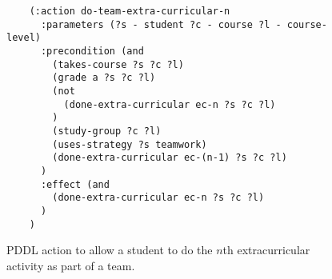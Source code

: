 \begin{figure}[t]
    \begin{lstlisting}
    (:action do-team-extra-curricular-n
      :parameters (?s - student ?c - course ?l - course-level)
      :precondition (and 
        (takes-course ?s ?c ?l)
        (grade a ?s ?c ?l)
        (not
          (done-extra-curricular ec-n ?s ?c ?l)
        )
        (study-group ?c ?l)
        (uses-strategy ?s teamwork)
        (done-extra-curricular ec-(n-1) ?s ?c ?l)
      )
      :effect (and 
        (done-extra-curricular ec-n ?s ?c ?l)
      )
    )
    \end{lstlisting}
    \caption{PDDL action to allow a student to do the $n$th extracurricular activity as part of a team.}\label{fig:team-extra-curricular-n}
    \end{figure}